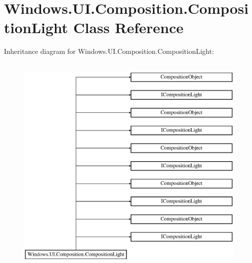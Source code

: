 \hypertarget{class_windows_1_1_u_i_1_1_composition_1_1_composition_light}{}\section{Windows.\+U\+I.\+Composition.\+Composition\+Light Class Reference}
\label{class_windows_1_1_u_i_1_1_composition_1_1_composition_light}
Inheritance diagram for Windows.\+U\+I.\+Composition.\+Composition\+Light\+:\begin{figure}[H]
\begin{center}
\leavevmode
\includegraphics[height=11.000000cm]{class_windows_1_1_u_i_1_1_composition_1_1_composition_light}
\end{center}
\end{figure}
